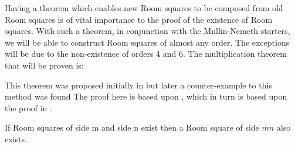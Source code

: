Having a theorem which enables new Room squares to be composed from old Room squares is of vital importance to the proof of the existence of Room squares.
With such a theorem, in conjunction with the Mullin-Nemeth starters, we will be able to construct Room squares of almost any order.
The exceptions will be due to the non-existence of orders 4 and 6.
The multiplication theorem that will be proven is:

This theorem was proposed initially in
\cite{bruckWhatLoop1963}
but later a counter-example to this method was found
\cite{mullinCounterexampleDirectProduct1969}
The proof here is based upon
\cite{andersonCombinatorialDesignsConstruction1990},
which in turn is based upon the proof in
\cite{stantonMultiplicationTheoremRoom1972a}.

\begin{theorem}
\label{thm:multiply}
	If Room squares of side m and side n exist then a Room square of side $mn$ also exists.
\end{theorem}

